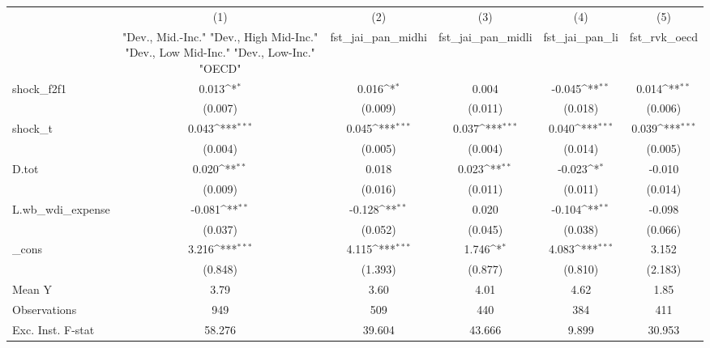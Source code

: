 {
\def\sym#1{\ifmmode^{#1}\else\(^{#1}\)\fi}
\begin{tabular}{l*{5}{c}}
\toprule
            &\multicolumn{1}{c}{(1)}&\multicolumn{1}{c}{(2)}&\multicolumn{1}{c}{(3)}&\multicolumn{1}{c}{(4)}&\multicolumn{1}{c}{(5)}\\
            &\multicolumn{1}{c}{ "Dev., Mid.-Inc." "Dev., High Mid-Inc." "Dev., Low Mid-Inc." "Dev., Low-Inc." "OECD" }&\multicolumn{1}{c}{fst\_jai\_pan\_midhi}&\multicolumn{1}{c}{fst\_jai\_pan\_midli}&\multicolumn{1}{c}{fst\_jai\_pan\_li}&\multicolumn{1}{c}{fst\_rvk\_oecd}\\
\midrule
shock\_f2f1  &       0.013\sym{*}  &       0.016\sym{*}  &       0.004         &      -0.045\sym{**} &       0.014\sym{**} \\
            &     (0.007)         &     (0.009)         &     (0.011)         &     (0.018)         &     (0.006)         \\
\addlinespace
shock\_t     &       0.043\sym{***}&       0.045\sym{***}&       0.037\sym{***}&       0.040\sym{***}&       0.039\sym{***}\\
            &     (0.004)         &     (0.005)         &     (0.004)         &     (0.014)         &     (0.005)         \\
\addlinespace
D.tot       &       0.020\sym{**} &       0.018         &       0.023\sym{**} &      -0.023\sym{*}  &      -0.010         \\
            &     (0.009)         &     (0.016)         &     (0.011)         &     (0.011)         &     (0.014)         \\
\addlinespace
L.wb\_wdi\_expense&      -0.081\sym{**} &      -0.128\sym{**} &       0.020         &      -0.104\sym{**} &      -0.098         \\
            &     (0.037)         &     (0.052)         &     (0.045)         &     (0.038)         &     (0.066)         \\
\addlinespace
\_cons      &       3.216\sym{***}&       4.115\sym{***}&       1.746\sym{*}  &       4.083\sym{***}&       3.152         \\
            &     (0.848)         &     (1.393)         &     (0.877)         &     (0.810)         &     (2.183)         \\
\midrule
Mean Y      &        3.79         &        3.60         &        4.01         &        4.62         &        1.85         \\
Observations&         949         &         509         &         440         &         384         &         411         \\
Exc. Inst. F-stat&      58.276         &      39.604         &      43.666         &       9.899         &      30.953         \\
\bottomrule
\end{tabular}
}
